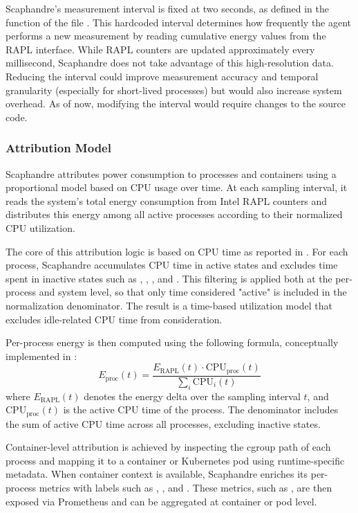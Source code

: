 Scaphandre's measurement interval is fixed at two seconds, as defined in the  function of the file . This hardcoded interval determines how frequently the agent performs a new measurement by reading cumulative energy values from the RAPL interface. While RAPL counters are updated approximately every millisecond, Scaphandre does not take advantage of this high-resolution data. Reducing the interval could improve measurement accuracy and temporal granularity (especially for short-lived processes) but would also increase system overhead. As of now, modifying the interval would require changes to the source code.

\subsubsection{Attribution Model}
\label{sec:scaphandre-attribution}

Scaphandre attributes power consumption to processes and containers using a proportional model based on CPU usage over time. At each sampling interval, it reads the system's total energy consumption from Intel RAPL counters and distributes this energy among all active processes according to their normalized CPU utilization.

The core of this attribution logic is based on CPU time as reported in . For each process, Scaphandre accumulates CPU time in active states and excludes time spent in inactive states such as , , , and . This filtering is applied both at the per-process and system level, so that only time considered "active" is included in the normalization denominator. The result is a time-based utilization model that excludes idle-related CPU time from consideration.

Per-process energy is then computed using the following formula, conceptually implemented in :
\begin{equation}
E_{\text{proc}}(t) = \frac{E_{\text{RAPL}}(t) \cdot \text{CPU}_{\text{proc}}(t)}{\sum_i \text{CPU}_i(t)}
\end{equation}
where \( E_{\text{RAPL}}(t) \) denotes the energy delta over the sampling interval \( t \), and \( \text{CPU}_{\text{proc}}(t) \) is the active CPU time of the process. The denominator includes the sum of active CPU time across all processes, excluding inactive states.

Container-level attribution is achieved by inspecting the cgroup path of each process and mapping it to a container or Kubernetes pod using runtime-specific metadata. When container context is available, Scaphandre enriches its per-process metrics with labels such as , , and . These metrics, such as , are then exposed via Prometheus and can be aggregated at container or pod level.

